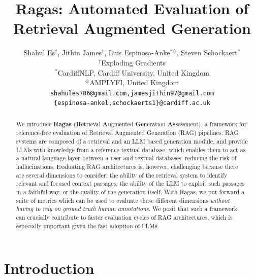 \documentclass[11pt]{article}
\title{Ragas: Automated Evaluation of Retrieval Augmented Generation}
\author{Shahul Es$^{\dagger}$, Jithin James$^{\dagger}$, Luis Espinosa-Anke$^{*\diamondsuit}$, Steven Schockaert$^{*}$ \\
        $^{\dagger}$Exploding Gradients \\ 
         $^{*}$CardiffNLP, Cardiff University, United Kingdom \\ 
         $^{\diamondsuit}$AMPLYFI, United Kingdom\\ 
         \texttt{shahules786@gmail.com,jamesjithin97@gmail.com}\\ 
         \texttt{\{espinosa-ankel,schockaerts1\}@cardiff.ac.uk}}
\begin{document}
\maketitle
\begin{abstract}
We introduce \textbf{Ragas} (\textbf{R}etrieval \textbf{A}ugmented \textbf{G}eneration \textbf{As}sessment), a framework for reference-free evaluation of Retrieval Augmented Generation (RAG) pipelines. RAG systems are composed of a retrieval and an LLM based generation module, and provide LLMs with knowledge from a reference textual database, which enables them to act as a natural language layer between a user and textual databases, reducing the risk of hallucinations. Evaluating RAG architectures is, however, challenging because there are several dimensions to consider: the ability of the retrieval system to identify relevant and focused context passages, the ability of the LLM to exploit such passages in a faithful way, or the quality of the generation itself. With Ragas, we put forward a suite of metrics which can be used to evaluate these different dimensions \textit{without having to rely on ground truth human annotations}. We posit that such a framework can crucially contribute to faster evaluation cycles of RAG architectures, which is especially important given the fast adoption of LLMs.

\end{abstract}

\section{Introduction}
\end{document}
